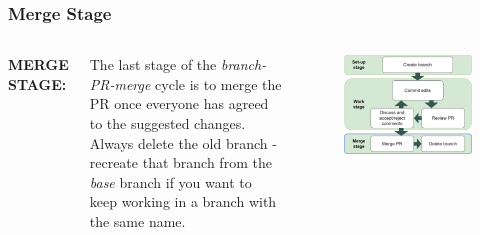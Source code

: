 \documentclass[aspectratio=169]{beamer}
\begin{document}
\begin{frame}
	\frametitle{Merge Stage}
	\begin{columns}[c]
		
		
		\Large \textbf{MERGE STAGE:}
		\vspace{.8em}
		
		\normalsize
		The last stage of the \textit{branch-PR-merge} cycle is to merge the PR
		once everyone has agreed to the suggested changes.
		\vspace{.5cm}\newline
		Always delete the old branch - recreate that branch from the \textit{base} branch
		if you want to keep working in a branch with the same name.
		
		\vspace{-.75cm}
		\begin{figure}
			\centering
			\includegraphics[width=\textwidth]{./img/branch-pr-merge-cycle-S3.png}
		\end{figure}
		
	\end{columns}
 
\end{frame}
\end{document}
